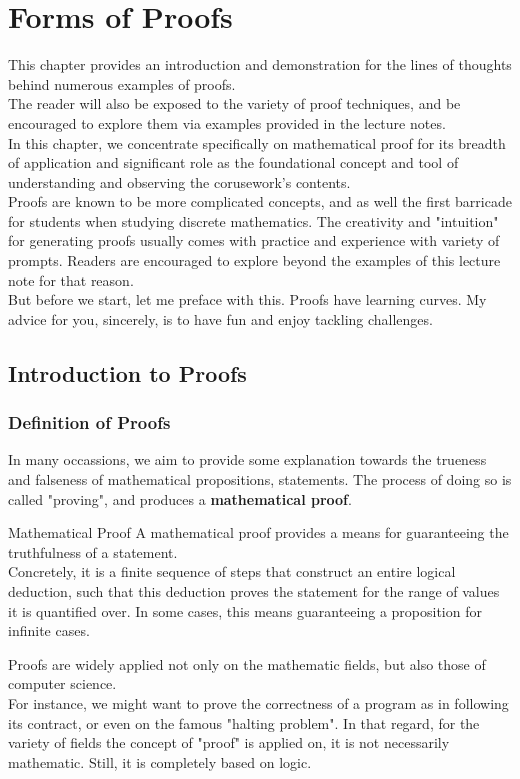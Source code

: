 \chapter{Forms of Proofs}
This chapter provides an introduction and demonstration for the lines of thoughts behind numerous examples of proofs. \\
The reader will also be exposed to the variety of proof techniques, and be encouraged to explore them via examples provided in the lecture notes. \\
In this chapter, we concentrate specifically on mathematical proof for its breadth of application and significant role as the foundational concept and tool of understanding and observing the corusework's contents. \\
Proofs are known to be more complicated concepts, and as well the first barricade for students when studying discrete mathematics. The creativity and "intuition" for generating proofs usually comes with practice and experience with variety of prompts. Readers are encouraged to explore beyond the examples of this lecture note for that reason. \\
But before we start, let me preface with this. Proofs have learning curves. My advice for you, sincerely, is to have fun and enjoy tackling challenges.

\section{Introduction to Proofs}

\subsection{Definition of Proofs}
In many occassions, we aim to provide some explanation towards the trueness and falseness of mathematical propositions, statements. The process of doing so is called "proving", and produces a \textbf{mathematical proof}.
\begin{ln-define}{Mathematical Proof}{}
    A mathematical proof provides a means for guaranteeing the truthfulness of a statement. \\
    Concretely, it is a finite sequence of steps that construct an entire logical deduction, such that this deduction proves the statement for the range of values it is quantified over. In some cases, this means guaranteeing a proposition for infinite cases.
\end{ln-define}
Proofs are widely applied not only on the mathematic fields, but also those of computer science. \\
For instance, we might want to prove the correctness of a program as in following its contract, or even on the famous "halting problem". In that regard, for the variety of fields the concept of "proof" is applied on, it is not necessarily mathematic. Still, it is completely based on logic.

